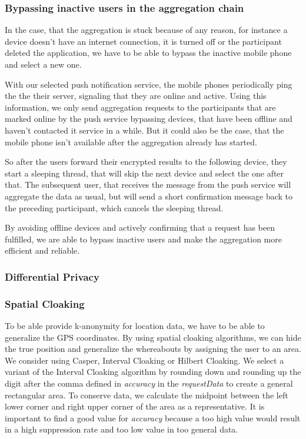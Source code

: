 \subsubsection{Bypassing inactive users in the aggregation chain}
In the case, that the aggregation is stuck because of any reason, for instance a device doesn't have an internet connection, it is turned off or the participant deleted the application, we have to be able to bypass the inactive mobile phone and select a new one.

With our selected push notification service, the mobile phones periodically ping the the their  server, signaling that they are online and active. Using this information, we only send aggregation requests to the participants that are marked online by the push service bypassing devices, that have been offline and haven't contacted it service in a while. But it could also be the case, that the mobile phone isn't available after the aggregation already has started.

So after the users forward their encrypted results to the following device, they start a sleeping thread, that will skip the next device and select the one after that. The subsequent user, that receives the message from the push service will aggregate the data as usual, but will send a short confirmation message back to the preceding participant, which cancels the sleeping thread. 

By avoiding offline devices and actively confirming that a request has been fulfilled, we are able to bypass inactive users and make the aggregation more efficient and reliable.

\subsubsection{Differential Privacy}

\subsubsection{Spatial Cloaking}
To be able provide k-anonymity for location data, we have to be able to generalize the GPS coordinates. By using spatial cloaking algorithms, we can hide the true position and generalize the whereabouts by assigning the user to an area. We consider using Casper, Interval Cloaking or Hilbert Cloaking. We select a variant of the Interval Cloaking algorithm  by rounding down and rounding up the digit after the comma defined in \textit{accuracy} in the \textit{requestData} to create a general rectangular area. To conserve data, we calculate the midpoint between the left lower corner and right upper corner of the area as a representative. It is important to find a good value for \textit{accuracy} because a too high value would result in a high suppression rate and too low value in too general data. 

